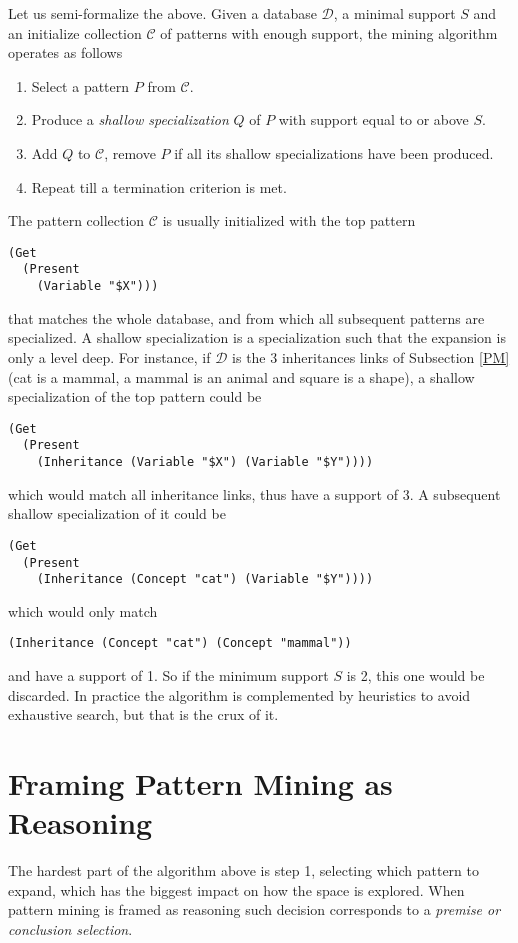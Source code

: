 \documentclass[runningheads]{llncs}
\begin{document}
Let us semi-formalize the above. Given a database $\mathcal{D}$, a
minimal support $S$ and an initialize collection $\mathcal{C}$ of
patterns with enough support, the mining algorithm operates as follows
\begin{enumerate}
\item Select a pattern $P$ from $\mathcal{C}$.
\item Produce a \emph{shallow specialization} $Q$ of $P$ with support
  equal to or above $S$.
\item Add $Q$ to $\mathcal{C}$, remove $P$ if all its shallow
  specializations have been produced.
\item Repeat till a termination criterion is met.
\end{enumerate}
The pattern collection $\mathcal{C}$ is usually initialized with the
top pattern
\begin{verbatim}
(Get
  (Present
    (Variable "$X")))
\end{verbatim}
that matches the whole database, and from which all subsequent
patterns are specialized. A shallow specialization is a specialization
such that the expansion is only a level deep. For instance, if
$\mathcal{D}$ is the 3 inheritances links of Subsection \ref{PM} (cat
is a mammal, a mammal is an animal and square is a shape), a shallow
specialization of the top pattern could be
\begin{verbatim}
(Get
  (Present
    (Inheritance (Variable "$X") (Variable "$Y"))))
\end{verbatim}
which would match all inheritance links, thus have a support of 3. A
subsequent shallow specialization of it could be
\begin{verbatim}
(Get
  (Present
    (Inheritance (Concept "cat") (Variable "$Y"))))
\end{verbatim}
which would only match
\begin{verbatim}
(Inheritance (Concept "cat") (Concept "mammal"))
\end{verbatim}
and have a support of 1. So if the minimum support $S$ is 2, this one
would be discarded. In practice the algorithm is complemented by
heuristics to avoid exhaustive search, but that is the crux of it.

\section{Framing Pattern Mining as Reasoning}
\label{FPMR}

The hardest part of the algorithm above is step 1, selecting which
pattern to expand, which has the biggest impact on how the space is
explored. When pattern mining is framed as reasoning such decision
corresponds to a \emph{premise or conclusion selection}.
\end{document}
